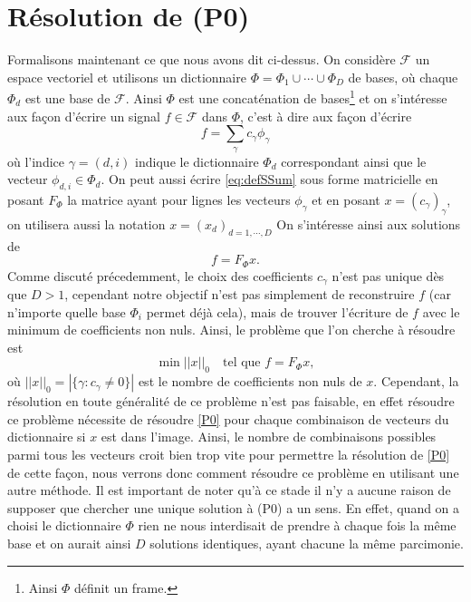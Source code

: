 \section{Résolution de (P0)}
Formalisons maintenant ce que nous avons dit ci-dessus. 
On considère $\mathcal{F}$ un espace vectoriel et utilisons un dictionnaire $\Phi = \Phi_1 \cup \cdots \cup \Phi_D$ de bases, où chaque $\Phi_d$ est une base de $\mathcal{F}$. 
Ainsi $\Phi$ est une concaténation de bases\footnote{Ainsi $\Phi$ définit un frame.} et on s'intéresse aux façon d'écrire un signal $f\in \mathcal{F}$ dans $\Phi$, c'est à dire aux façon d'écrire
\begin{equation}\label{eq:defSSum}
	f = \sum_\gamma c_\gamma \phi_\gamma
\end{equation}
où l'indice $\gamma = (d, i)$ indique le dictionnaire $\Phi_d$ correspondant ainsi que le vecteur $\phi_{d, i} \in \Phi_d$.
On peut aussi écrire \ref{eq:defSSum} sous forme matricielle en posant $F_\Phi$ la matrice ayant pour lignes les vecteurs $\phi_\gamma$ et en posant $x = (c_\gamma)_\gamma$, on utilisera aussi la notation $x = (x_d)_{d=1, \cdots, D}$
On s'intéresse ainsi aux solutions de 
\begin{equation}
	f = F_\Phi x.
\end{equation}
Comme discuté précedemment, le choix des coefficients $c_\gamma$ n'est pas unique dès que $D>1$, cependant notre objectif n'est pas simplement de reconstruire $f$ (car n'importe quelle base $\Phi_i$ permet déjà cela), mais de trouver l'écriture de $f$ avec le minimum de coefficients non nuls.
Ainsi, le problème que l'on cherche à résoudre est 
\begin{equation}\label{P0}\tag{P0}
	\min ||x||_0\quad \text{tel que } f = F_\Phi x,
\end{equation}
où $||x||_0 = |\{\gamma : c_\gamma \neq 0\}|$ est le nombre de coefficients non nuls de $x$.
Cependant, la résolution en toute généralité de ce problème n'est pas faisable, en effet résoudre ce problème nécessite de résoudre \ref{P0} pour chaque combinaison de vecteurs du dictionnaire si $x$ est dans l'image.
Ainsi, le nombre de combinaisons possibles parmi tous les vecteurs croit bien trop vite pour permettre la résolution de \ref{P0} de cette façon, nous verrons donc comment résoudre ce problème en utilisant une autre méthode.
\newline
Il est important de noter qu'à ce stade il n'y a aucune raison de supposer que chercher une unique solution à (P0) a un sens.
En effet, quand on a choisi le dictionnaire $\Phi$ rien ne nous interdisait de prendre à chaque fois la même base et on aurait ainsi $D$ solutions identiques, ayant chacune la même parcimonie.
